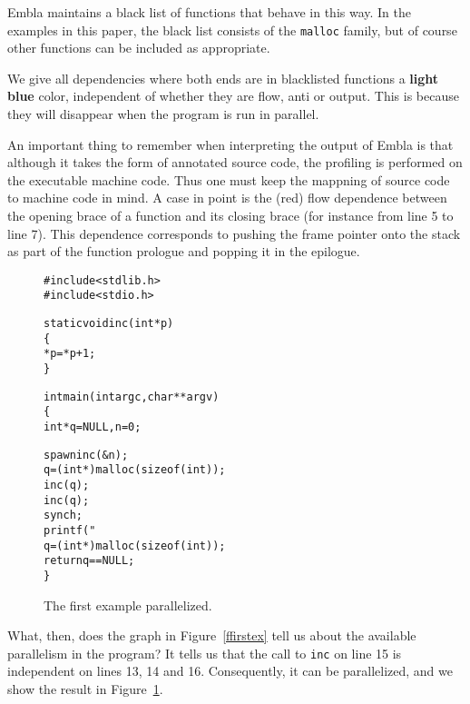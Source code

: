 Embla maintains a black list of functions that behave in this way.
In the examples in this paper, the black list consists of the 
{\tt malloc} family, but of course other functions can be included 
as appropriate. 

We give all dependencies where both ends are in blacklisted functions 
a {\bf \color{cyan}light blue} color, independent of whether they are 
flow, anti or output. This is because they will disappear when the
program is run in parallel.

An important thing to remember when interpreting the output of Embla 
is that although it takes the form of annotated source code, the 
profiling is performed on the executable machine code. Thus one must
keep the mappning of source code to machine code in mind. A case in 
point is the (red) flow dependence between the opening brace of a 
function and its closing brace (for instance from line 5 to line 7).
This dependence corresponds to pushing the frame pointer onto the 
stack as part of the function prologue and popping it in the 
epilogue.

\begin{figure}
\small
\hrulefill
\begin{alltt}
#include <stdlib.h>
#include <stdio.h>

static void inc(int *p)
\verb+{+
   *p=*p+1;
\verb+}+

int main(int argc, char **argv)
\verb+{+
   int *q=NULL,n=0;

   {\color{red}spawn} inc(&n);
   q = (int*) malloc( sizeof(int) );
   inc(q);
   inc(q);
   {\color{red}synch;}
   printf( "%d\verb+\+n", *q+n );
   q = (int*) malloc( sizeof(int) );
   return q==NULL;
\verb+}+
\end{alltt}
\hrulefill
\caption{The first example parallelized.}
\label{fparfirstex}
\end{figure}

What, then, does the graph in Figure~\ref{ffirstex} tell us about
the available parallelism in the program? It tells us that 
the call to {\tt inc} on line 15 is independent on lines 13, 14
and 16. Consequently, it can be parallelized, and we show the
result in Figure~\ref{fparfirstex}.

\begin{figure} 
\small

\end{figure}


